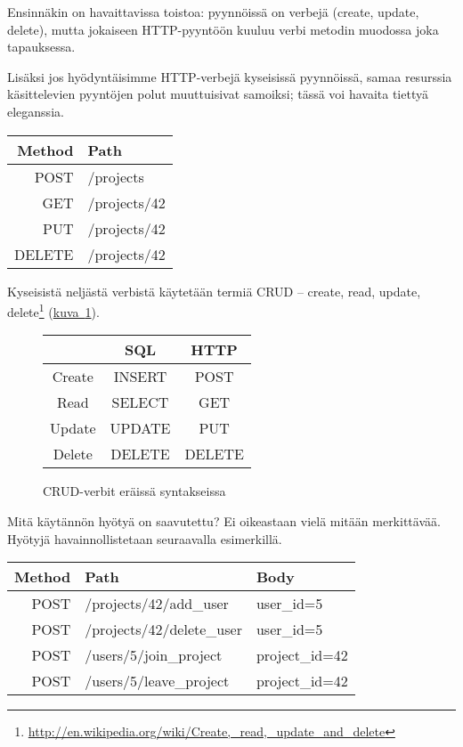 \documentclass{article}
\newenvironment{myfigure}{
  \begin{figure}
    \centering
    \begin{lrbox}{\myfigurebox}
      \begin{minipage}{0.8\textwidth}
}{
      \end{minipage}
    \end{lrbox}
    \fcolorbox{blue}{blue!1}{\usebox{\myfigurebox}}
  \end{figure}
}
\newcommand{\myref}[2]{\hyperref[#2]{#1~\ref*{#2}}}
\newcommand{\pdfforeignlanguage}[2]{\texorpdfstring{\foreignlanguage{#1}{#2}}{#2}}
\newcommand{\eng}[1]{\pdfforeignlanguage{english}{#1}}
\newenvironment{english}{\begin{otherlanguage}{english}}{\end{otherlanguage}}
\begin{document}
Ensinnäkin on havaittavissa toistoa: pyynnöissä on verbejä (\eng{create,
update, delete}), mutta jokaiseen HTTP-pyyntöön kuuluu verbi metodin muodossa
joka tapauksessa.

\begin{samepage}
Lisäksi jos hyödyntäisimme HTTP-verbejä kyseisissä pyynnöissä, samaa resurssia
käsittelevien pyyntöjen polut muuttuisivat samoiksi; tässä voi havaita tiettyä
eleganssia.

\begin{english}
\begin{tabular}{|r|l|}
\hline
Method & Path         \\
\hline
POST   & /projects    \\
GET    & /projects/42 \\
PUT    & /projects/42 \\
DELETE & /projects/42 \\
\hline
\end{tabular}
\end{english}
\end{samepage}

Kyseisistä neljästä verbistä käytetään termiä \eng{CRUD -- create, read,
update,
delete}\footnote{\url{http://en.wikipedia.org/wiki/Create,\_read,\_update\_and\_delete}}
(\myref{kuva}{fig:crud}).

\begin{myfigure}
\centering
\begin{english}
\begin{tabular}{|c|c|c|}
\hline
       & SQL    & HTTP   \\
\hline
Create & INSERT & POST   \\
Read   & SELECT & GET    \\
Update & UPDATE & PUT    \\
Delete & DELETE & DELETE \\
\hline
\end{tabular}
\end{english}
\caption{CRUD-verbit eräissä syntakseissa}
\label{fig:crud}
\end{myfigure}

\begin{samepage}
Mitä käytännön hyötyä on saavutettu? Ei oikeastaan vielä mitään merkittävää.
Hyötyjä havainnollistetaan seuraavalla esimerkillä.

\begin{english}
\begin{tabular}{|r|l|l|}
\hline
Method & Path                      & Body           \\
\hline
POST   & /projects/42/add\_user    & user\_id=5     \\
POST   & /projects/42/delete\_user & user\_id=5     \\
\hline
POST   & /users/5/join\_project    & project\_id=42 \\
POST   & /users/5/leave\_project   & project\_id=42 \\
\hline
\end{tabular}
\end{english}
\end{samepage}
\end{document}
